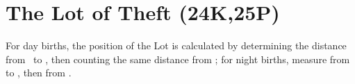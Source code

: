 \section{The Lot of Theft (24K,25P)}

For day births, the position of the Lot is calculated by determining the distance from \Mercury\, to \Mars,
then counting the same distance from \Saturn; for night births, measure from \Mars\, to \Mercury, then from \Saturn.

\newpage